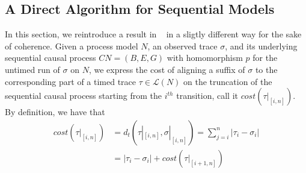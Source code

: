\documentclass[conference]{IEEEtran}
\begin{document}
\subsection{A Direct Algorithm for Sequential Models}\label{mcg}

In this section, we reintroduce a result in ~\cite{CR22} in a sligtly different way for the sake of coherence. Given a process model $N$, an observed trace $\sigma$, and its underlying sequential causal process $CN = (B, E, G)$ with homomorphism $p$ for the untimed run of $\sigma$ on $N$, we express the cost of aligning a suffix of $\sigma$ to the corresponding part of a timed trace $\tau \in \mathcal{L}(N)$ on the truncation of the sequential causal process starting from the $i^{th}$ transition, call it $cost(\tau|_{[i,n]})$. 
By definition, we have that
\begin{equation}
	\begin{split}
		cost(\tau|_{[i,n]}) &= d_t(\tau|_{[i,n]},\sigma|_{[i,n]}) = \sum_{j = i}^{n}|\tau_i-\sigma_i|\\
												&= |\tau_i - \sigma_i| + cost(\tau|_{[i+1,n]})\\
	\end{split}
	\label{eq:cost_function}
\end{equation}
\end{document}
